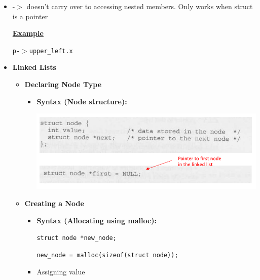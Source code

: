 \documentclass[12pt]{article}
\begin{document}
\begin{enumerate}[1.]
    \begin{itemize}
        \item -$>$ doesn't carry over to accessing nested members. Only works when
        struct is a pointer

        \bigskip

        \underline{\textbf{Example}}

        \bigskip

        \texttt{p-$>$upper\_left.x}

        \bigskip
        \item \textbf{Linked Lists}

        \begin{itemize}
            \item \textbf{Declaring Node Type}

            \begin{itemize}
                \item \textbf{Syntax (Node structure):}

                \begin{center}
                \includegraphics[width=\linewidth]{images/review_8_solution_2.png}
                \end{center}

            \end{itemize}

            \item \textbf{Creating a Node}

            \begin{itemize}
                \item \textbf{Syntax (Allocating using malloc):}

                \bigskip

                \texttt{struct node *new\_node;}

                \texttt{new\_node = malloc(sizeof(struct node));}

                \bigskip

                \item Assigning value


\end{itemize}
\end{itemize}
\end{itemize}
\end{enumerate}
\end{document}
